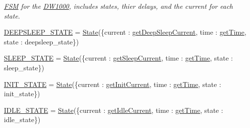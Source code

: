 \begin{DoxyCompactItemize}
\begin{DoxyCompactList}\small\item\em \mbox{\hyperlink{namespacesimlib_1_1_f_s_m}{F\+SM}} for the \mbox{\hyperlink{classsimlib_1_1_f_s_m_1_1_d_w1000}{D\+W1000}}, includes states, thier delays, and the current for each state. \end{DoxyCompactList}\item 
\mbox{\hyperlink{namespacesimlib_1_1_f_s_m_aafe5837c1b03313c6f9c79aaa04a7652}{D\+E\+E\+P\+S\+L\+E\+E\+P\+\_\+\+S\+T\+A\+TE}} = \mbox{\hyperlink{classsimlib_1_1_f_s_m_1_1_state}{State}}(\{\textquotesingle{}current\textquotesingle{} \+: \mbox{\hyperlink{namespacesimlib_1_1_f_s_m_a327a557b074384ce208b09d4ec807432}{get\+Deep\+Sleep\+Current}}, \textquotesingle{}time\textquotesingle{} \+: \mbox{\hyperlink{namespacesimlib_1_1_f_s_m_a11348c0ee93cab46de076fcf8ec8395f}{get\+Time}}, \textquotesingle{}state\textquotesingle{} \+: \textquotesingle{}deepsleep\+\_\+state\textquotesingle{}\})
\item 
\mbox{\hyperlink{namespacesimlib_1_1_f_s_m_afa89abddbf2839bf261c6b739174973b}{S\+L\+E\+E\+P\+\_\+\+S\+T\+A\+TE}} = \mbox{\hyperlink{classsimlib_1_1_f_s_m_1_1_state}{State}}(\{\textquotesingle{}current\textquotesingle{} \+: \mbox{\hyperlink{namespacesimlib_1_1_f_s_m_a725cd2ce73a773f4ea7d01dede859fe5}{get\+Sleep\+Current}}, \textquotesingle{}time\textquotesingle{} \+: \mbox{\hyperlink{namespacesimlib_1_1_f_s_m_a11348c0ee93cab46de076fcf8ec8395f}{get\+Time}}, \textquotesingle{}state\textquotesingle{} \+: \textquotesingle{}sleep\+\_\+state\textquotesingle{}\})
\item 
\mbox{\hyperlink{namespacesimlib_1_1_f_s_m_a898455364bde4844e371110a5ca96f9e}{I\+N\+I\+T\+\_\+\+S\+T\+A\+TE}} = \mbox{\hyperlink{classsimlib_1_1_f_s_m_1_1_state}{State}}(\{\textquotesingle{}current\textquotesingle{} \+: \mbox{\hyperlink{namespacesimlib_1_1_f_s_m_a585836de7988c4c8a00953ff69743ebb}{get\+Init\+Current}}, \textquotesingle{}time\textquotesingle{} \+: \mbox{\hyperlink{namespacesimlib_1_1_f_s_m_a11348c0ee93cab46de076fcf8ec8395f}{get\+Time}}, \textquotesingle{}state\textquotesingle{} \+: \textquotesingle{}init\+\_\+state\textquotesingle{}\})
\item 
\mbox{\hyperlink{namespacesimlib_1_1_f_s_m_ad20271829f08fa7dbdd0c9648f2987e4}{I\+D\+L\+E\+\_\+\+S\+T\+A\+TE}} = \mbox{\hyperlink{classsimlib_1_1_f_s_m_1_1_state}{State}}(\{\textquotesingle{}current\textquotesingle{} \+: \mbox{\hyperlink{namespacesimlib_1_1_f_s_m_a794c6f3e74c219f76fce65bc83c37cf2}{get\+Idle\+Current}}, \textquotesingle{}time\textquotesingle{} \+: \mbox{\hyperlink{namespacesimlib_1_1_f_s_m_a11348c0ee93cab46de076fcf8ec8395f}{get\+Time}}, \textquotesingle{}state\textquotesingle{} \+: \textquotesingle{}idle\+\_\+state\textquotesingle{}\})

\end{DoxyCompactItemize}
